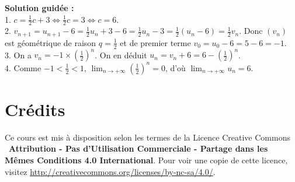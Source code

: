 \documentclass{article}
\begin{document}
\vspace{1em}
\noindent\textbf{Solution guidée :} \\[0.5em]
1. \(c = \frac{1}{2}c + 3 \iff \frac{1}{2}c = 3 \iff c = 6\). \\
2. \(v_{n+1} = u_{n+1} - 6 = \frac{1}{2}u_n + 3 - 6 = \frac{1}{2}u_n - 3 = \frac{1}{2}(u_n - 6) = \frac{1}{2}v_n\). Donc \((v_n)\) est géométrique de raison \(q = \frac{1}{2}\) et de premier terme \(v_0 = u_0 - 6 = 5 - 6 = -1\). \\
3. On a \(v_n = -1 \times \left(\frac{1}{2}\right)^n\). On en déduit \(u_n = v_n + 6 = 6 - \left(\frac{1}{2}\right)^n\). \\
4. Comme \(-1 < \frac{1}{2} < 1\), \(\lim_{n \to +\infty} \left(\frac{1}{2}\right)^n = 0\), d'où \(\lim_{n \to +\infty} u_n = 6\).

\newpage
\tableofcontents

\section*{Crédits}
Ce cours est mis à disposition selon les termes de la Licence Creative Commons \ccbyncsa\ \textbf{Attribution - Pas d'Utilisation Commerciale - Partage dans les Mêmes Conditions 4.0 International}. 
Pour voir une copie de cette licence, visitez \url{http://creativecommons.org/licenses/by-nc-sa/4.0/}.
\end{document}

